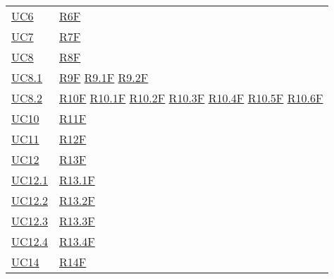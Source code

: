 \begin{center}
\begin{longtable}[!h]{m{50px} m{50px}}
        \hyperref[sec:UC6]{UC6}           & \hyperref[tab:RequisitiFunzionali]{R6F}    \\
        \hyperref[sec:UC7]{UC7}           & \hyperref[tab:RequisitiFunzionali]{R7F}    \\
        \hyperref[sec:UC8]{UC8}           & \hyperref[tab:RequisitiFunzionali]{R8F}    \\

        \hyperref[sec:UC8.1]{UC8.1}       & \hyperref[tab:RequisitiFunzionali]{R9F}
        \newline \hyperref[tab:RequisitiFunzionali]{R9.1F}
        \newline \hyperref[tab:RequisitiFunzionali]{R9.2F}                             \\

        \hyperref[sec:UC8.2]{UC8.2}       & \hyperref[tab:RequisitiFunzionali]{R10F}
        \newline \hyperref[tab:RequisitiFunzionali]{R10.1F}
        \newline \hyperref[tab:RequisitiFunzionali]{R10.2F}
        \newline \hyperref[tab:RequisitiFunzionali]{R10.3F}
        \newline \hyperref[tab:RequisitiFunzionali]{R10.4F}
        \newline \hyperref[tab:RequisitiFunzionali]{R10.5F}
        \newline \hyperref[tab:RequisitiFunzionali]{R10.6F}                            \\

        \hyperref[sec:UC10]{UC10}         & \hyperref[tab:RequisitiFunzionali]{R11F}   \\
        \hyperref[sec:UC11]{UC11}         & \hyperref[tab:RequisitiFunzionali]{R12F}   \\
        \hyperref[sec:UC12]{UC12}         & \hyperref[tab:RequisitiFunzionali]{R13F}   \\
        \hyperref[sec:UC12.1]{UC12.1}     & \hyperref[tab:RequisitiFunzionali]{R13.1F} \\
        \hyperref[sec:UC12.2]{UC12.2}     & \hyperref[tab:RequisitiFunzionali]{R13.2F} \\
        \hyperref[sec:UC12.3]{UC12.3}     & \hyperref[tab:RequisitiFunzionali]{R13.3F} \\
        \hyperref[sec:UC12.4]{UC12.4}     & \hyperref[tab:RequisitiFunzionali]{R13.4F} \\
        \hyperref[sec:UC14]{UC14}         & \hyperref[tab:RequisitiFunzionali]{R14F}   \\


\end{longtable}
\end{center}
